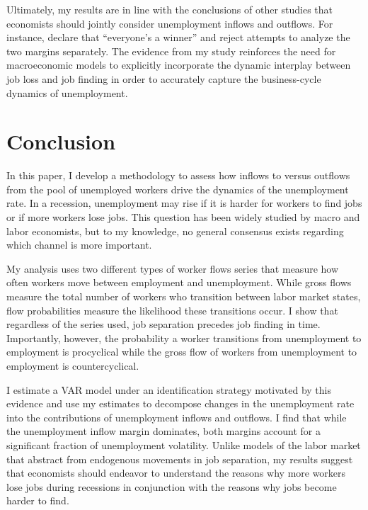 \documentclass[12pt]{article}
\begin{document}
Ultimately, my results are in line with the conclusions of other studies that economists should jointly consider unemployment inflows and outflows. For instance, \cite{Elsby:2009aa} declare that ``everyone's a winner'' and reject attempts to analyze the two margins separately. The evidence from my study reinforces the need for macroeconomic models to explicitly incorporate the dynamic interplay between job loss and job finding in order to accurately capture the business-cycle dynamics of unemployment.

\section{Conclusion}\label{sec:conclusion}

In this paper, I develop a methodology to assess how inflows to versus outflows from the pool of unemployed workers drive the dynamics of the unemployment rate. In a recession, unemployment may rise if it is harder for workers to find jobs or if more workers lose jobs. This question has been widely studied by macro and labor economists, but to my knowledge, no general consensus exists regarding which channel is more important.

My analysis uses two different types of worker flows series that measure how often workers move between employment and unemployment. While gross flows measure the total number of workers who transition between labor market states, flow probabilities measure the likelihood these transitions occur. I show that regardless of the series used, job separation precedes job finding in time. Importantly, however, the probability a worker transitions from unemployment to employment is procyclical while the gross flow of workers from unemployment to employment is countercyclical.

I estimate a VAR model under an identification strategy motivated by this evidence and use my estimates to decompose changes in the unemployment rate into the contributions of unemployment inflows and outflows. I find that while the unemployment inflow margin dominates, both margins account for a significant fraction of unemployment volatility. Unlike models of the labor market that abstract from endogenous movements in job separation, my results suggest that economists should endeavor to understand the reasons why more workers lose jobs during recessions in conjunction with the reasons why jobs become harder to find. 
\end{document}
